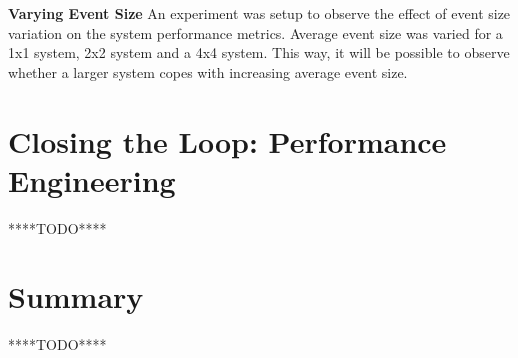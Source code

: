 \textbf{Varying Event Size}
An experiment was setup to observe the effect of event size variation on the system performance metrics. Average event size was varied for a 1x1 system, 2x2 system and a 4x4 system. This way, it will be possible to observe whether a larger system copes with increasing average event size. 


\section{Closing the Loop: Performance Engineering}
****TODO****

\section{Summary}
****TODO****
